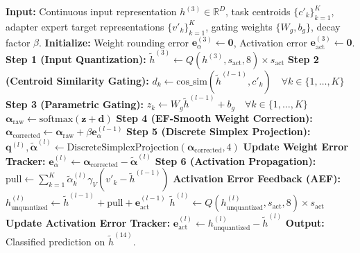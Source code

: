 \documentclass{article}
\theoremstyle{plain}
\theoremstyle{definition}
\theoremstyle{remark}
\begin{document}
\begin{algorithm}[H]
\caption{QA-Merge Low-Precision Coordinate Propagation and Ensembling Loop}
\label{alg:qamergeloop}
\begin{algorithmic}[1]
\STATE \textbf{Input:} Continuous input representation $h^{(3)} \in \mathbb{R}^D$, task centroids $\{c'_k\}_{k=1}^K$, adapter expert target representations $\{v'_k\}_{k=1}^K$, gating weights $\{W_g, b_g\}$, decay factor $\beta$.
\STATE \textbf{Initialize:} Weight rounding error $\mathbf{e}_{\alpha}^{(3)} \leftarrow \mathbf{0}$, Activation error $\mathbf{e}_{\text{act}}^{(3)} \leftarrow \mathbf{0}$.
\STATE \textbf{Step 1 (Input Quantization):} $\tilde{h}^{(3)} \leftarrow Q(h^{(3)}, s_{\text{act}}, 8) \times s_{\text{act}}$
    \STATE \textbf{Step 2 (Centroid Similarity Gating):}
    \STATE $d_k \leftarrow \text{cos\_sim}(\tilde{h}^{(l-1)}, c'_k) \quad \forall k \in \{1, \dots, K\}$
    \STATE \textbf{Step 3 (Parametric Gating):}
    \STATE $z_k \leftarrow W_g \tilde{h}^{(l-1)} + b_g \quad \forall k \in \{1, \dots, K\}$
    \STATE $\boldsymbol{\alpha}_{\text{raw}} \leftarrow \text{softmax}(\mathbf{z} + \mathbf{d})$
    \STATE \textbf{Step 4 (EF-Smooth Weight Correction):}
    \STATE $\boldsymbol{\alpha}_{\text{corrected}} \leftarrow \boldsymbol{\alpha}_{\text{raw}} + \beta \mathbf{e}_{\alpha}^{(l-1)}$
    \STATE \textbf{Step 5 (Discrete Simplex Projection):}
    \STATE $\mathbf{q}^{(l)}, \tilde{\boldsymbol{\alpha}}^{(l)} \leftarrow \text{DiscreteSimplexProjection}(\boldsymbol{\alpha}_{\text{corrected}}, 4)$
    \STATE \textbf{Update Weight Error Tracker:} $\mathbf{e}_{\alpha}^{(l)} \leftarrow \boldsymbol{\alpha}_{\text{corrected}} - \tilde{\boldsymbol{\alpha}}^{(l)}$
    \STATE \textbf{Step 6 (Activation Propagation):}
    \STATE $\text{pull} \leftarrow \sum_{k=1}^K \tilde{\alpha}_k^{(l)} \gamma_V (v'_k - \tilde{h}^{(l-1)})$
    \STATE \textbf{Activation Error Feedback (AEF):}
    \STATE $h^{(l)}_{\text{unquantized}} \leftarrow \tilde{h}^{(l-1)} + \text{pull} + \mathbf{e}_{\text{act}}^{(l-1)}$
    \STATE $\tilde{h}^{(l)} \leftarrow Q(h^{(l)}_{\text{unquantized}}, s_{\text{act}}, 8) \times s_{\text{act}}$
    \STATE \textbf{Update Activation Error Tracker:} $\mathbf{e}_{\text{act}}^{(l)} \leftarrow h^{(l)}_{\text{unquantized}} - \tilde{h}^{(l)}$
\ENDFOR
\STATE \textbf{Output:} Classified prediction on $\tilde{h}^{(14)}$.
\end{algorithmic}
\end{algorithm}
\end{document}
